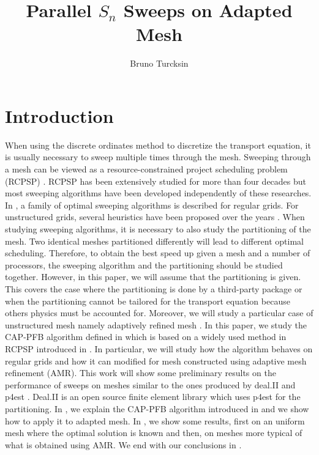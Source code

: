 \documentclass[letterpaper]{article}
\renewcommand{\(}{\left(}
\renewcommand{\)}{\right)}
\renewcommand{\[}{\left[}
\renewcommand{\]}{\right]}
\begin{document}
\title{Parallel $S_n$ Sweeps on Adapted Mesh}
\author{Bruno Turcksin} 
\date{}
\maketitle

\section{Introduction}
When using the discrete ordinates method to discretize the transport equation,
it is usually necessary to sweep multiple times through the mesh. Sweeping through a mesh can
be viewed as a resource-constrained project scheduling problem (RCPSP)
\cite{Brucker1999,Kolisch2006}. RCPSP has been extensively studied for more than
four decades \cite{Pritsker1969} but most sweeping algorithms have been
developed independently of these researches. In \cite{Adams2013}, a family of
optimal sweeping algorithms is described for regular grids. For
unstructured grids, several heuristics have been proposed over the years
\cite{Pautz2002,Plimpton2005,Yan2013,Colomer2013,Kumar2005}. When studying
sweeping algorithms, it is necessary to also study the partitioning of the mesh.
Two identical meshes partitioned differently will lead to different optimal
scheduling. Therefore, to obtain the best speed up given a mesh and a number of
processors, the sweeping algorithm and the partitioning should be studied
together. However, in this paper, we will assume that the partitioning is given.
This covers the case where the partitioning is
done by a third-party package or when the partitioning cannot be tailored for the
transport equation because others physics must be accounted for. Moreover, we
will study a particular case of unstructured mesh namely adaptively refined mesh
\cite{Arnold2000,Baker2002,Bangerth2007,Jessee1998,Wang2010a}. In this paper, we
study the CAP-PFB algorithm defined in \cite{Mo2014} which is based on a widely
used method in RCPSP introduced in \cite{Li1992}. In particular, we will study
how the algorithm behaves on regular grids and how it can modified for mesh
constructed using adaptive mesh refinement (AMR). This work will show some
preliminary results on the performance of sweeps on meshes similar to the ones
produced by deal.II \cite{Bangerth2007,Bangerth2013} and p4est
\cite{Burstedde2011}. Deal.II is an open source finite element library which
uses p4est for the partitioning. In , we explain the
CAP-PFB algorithm introduced in \cite{Mo2014} and we show how to apply it to
adapted mesh. In , we show some results, first on an uniform mesh
where the optimal solution is known and then, on meshes more typical of what is
obtained using AMR. We end with our conclusions in .
\end{document}
